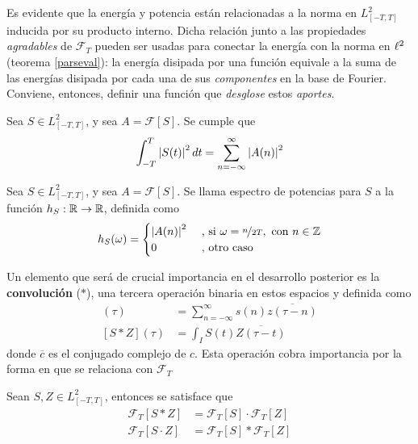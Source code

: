 Es evidente que la energía y potencia están relacionadas a la norma en $L^{2}_{[-T,T]}$ inducida por
su producto interno.
%
Dicha relación junto a las propiedades \textit{agradables} de $\mathcal{F}_T$ pueden ser usadas 
para conectar la energía con la norma en $\ell^{2}$ (teorema \ref{parseval}): la energía disipada por 
una función equivale a la suma de las energías disipada por cada una de sus \textit{componentes} en 
la base de Fourier.
%
Conviene, entonces, definir una función que \textit{desglose} estos \textit{aportes}.

\begin{teorema}[Parseval]
Sea $S \in L^{2}_{[-T,T]}$, y sea $A = \mathcal{F}[S]$. Se cumple que
\begin{equation*}
\int_{-T}^{T} \left| S(t) \right|^{2} dt = \sum_{n=-\infty}^{\infty} \left| A(n) \right|^{2}
\end{equation*}
\label{parseval}
\end{teorema}

\begin{definicion}
Sea $S \in L^{2}_{[-T,T]}$, y sea $A = \mathcal{F}[S]$. Se llama espectro de potencias 
para $S$ a la función $h_S : \mathbb{R} \rightarrow \mathbb{R} $, definida como
\begin{equation*}
h_S(\omega) = 
\begin{cases}
\left| A(n) \right|^{2} & \text{ , si } \omega = \nicefrac{n}{2T}, \text{   con } n\in \mathbb{Z} \\
0 & \text{ ,  otro caso}
\end{cases}
\end{equation*}
\label{espec}
\end{definicion}

Un elemento que será de crucial importancia en el desarrollo posterior es la \textbf{convolución} 
($\ast$), una tercera operación binaria en estos espacios y definida como
%
\begin{align*}
[s \ast z] (\tau) &= \sum_{n=-\infty}^{\infty} s(n) \overline{z(\tau-n)} \\
[S \ast Z] (\tau) &= \int_I S(t) \overline{Z(\tau-t)}
\end{align*}
%
donde $\overline{c}$ es el conjugado complejo de $c$. 
%
Esta operación cobra importancia por la forma en que se relaciona con $\mathcal{F}_T$
%
\begin{observacion}%
Sean $S,Z \in L^{2}_{[-T,T]}$, entonces se satisface que
\begin{align*}
\mathcal{F}_T[S\ast Z]  &= \mathcal{F}_T[S] \cdot \mathcal{F}_T[Z] \\
\mathcal{F}_T[S\cdot Z] &= \mathcal{F}_T[S] \ast  \mathcal{F}_T[Z] 
\end{align*}
\label{t_convolucion}
\end{observacion}

